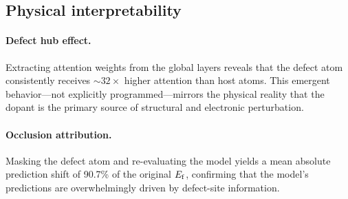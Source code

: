 \subsection{Physical interpretability}\label{sec:interpret}

\paragraph{Defect hub effect.}
Extracting attention weights from the global layers reveals that the
defect atom consistently receives ${\sim}32\times$ higher attention than
host atoms.
This emergent behavior---not explicitly programmed---mirrors the physical
reality that the dopant is the primary source of structural and electronic
perturbation.

\paragraph{Occlusion attribution.}
Masking the defect atom and re-evaluating the model yields a mean absolute
prediction shift of 90.7\% of the original $E_\mathrm{f}$, confirming that the
model's predictions are overwhelmingly driven by defect-site information.
